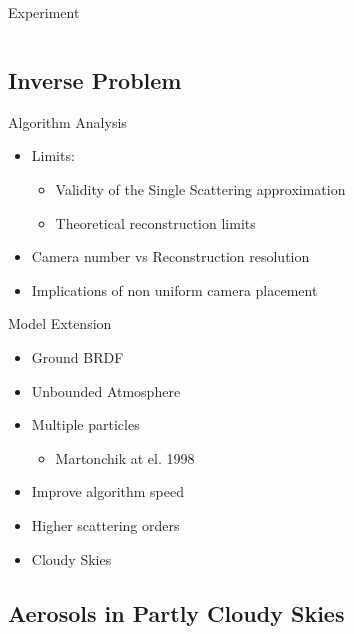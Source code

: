 \documentclass[compress,red,12pt]{beamer}
\begin{document}
\begin{frame}{Experiment}
{\begin{columns}[C]
\begin{column}{.3\textwidth}
      \end{column}
    \end{columns}
  }
\end{frame}


\subsection{Inverse Problem}

\begin{frame}{Algorithm Analysis}
  \begin{itemize}
  \item<1-> Limits:
    \begin{itemize}
    \item Validity of the Single Scattering approximation
    \item Theoretical reconstruction limits
    \end{itemize}
  \item<2-> Camera number vs Reconstruction resolution
  \item<3-> Implications of non uniform camera placement
  \end{itemize}
\end{frame}


\begin{frame}{Model Extension}
  \begin{itemize}
  \item<1-> Ground BRDF
  \item<2-> Unbounded Atmosphere
  \item<3-> Multiple particles
    \begin{itemize}
    \item Martonchik at el. 1998
    \end{itemize}
  \item<4-> Improve algorithm speed
  \item<5-> Higher scattering orders
  \item<6-> Cloudy Skies
  \end{itemize}
\end{frame}


\subsection{Aerosols in Partly Cloudy Skies}
\end{document}
